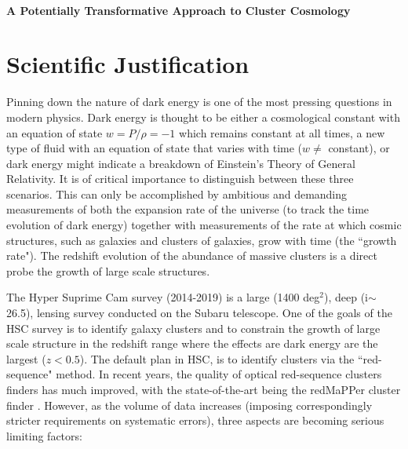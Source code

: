 \documentclass[letterpaper,12pt,dvips]{article}
\begin{document}
\\[-1cm]
\begin{center}
\bf\Large
A Potentially Transformative Approach to Cluster Cosmology 
\end{center}

\section{Scientific Justification} 

Pinning down the nature of dark energy is one of the most pressing questions in modern physics. Dark energy is thought to be either a cosmological constant with an equation of state $w=P/\rho=-1$ which remains constant at all times, a new type of fluid with an equation of state that varies with time ($w \neq$ constant), or dark energy might indicate a breakdown of Einstein's Theory of General Relativity. It is of critical importance to distinguish between these three scenarios. This can only be accomplished by ambitious and demanding measurements of both the expansion rate of the universe (to track the time evolution of dark energy) together with measurements of the rate at which cosmic structures, such as galaxies and clusters of galaxies, grow with time (the ``growth rate"). The redshift evolution of the abundance of massive clusters is a direct probe the growth of large scale structures.

The Hyper Suprime Cam survey (2014-2019) is a large (1400 deg$^2$), deep (i$\sim$26.5), lensing survey conducted on the Subaru telescope. One of the goals of the HSC survey is to identify galaxy clusters and to constrain the growth of large scale structure in the redshift range where the effects are dark energy are the largest ($z<0.5$). The default plan in HSC, is to identify clusters via the  ``red-sequence" method. In recent years, the quality of optical red-sequence clusters finders has much improved, with the state-of-the-art being the redMaPPer cluster finder \citep[][]{Rykoff:2014,Rozo:2014}. However, as the volume of data increases (imposing correspondingly stricter requirements on systematic errors), three aspects are becoming serious limiting factors:
\end{document}

